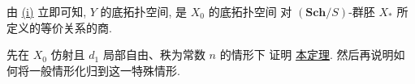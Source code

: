 由 \hyperref[thm:sga3-V-4.1-i]{(i)} 立即可知,
\(Y\) 的底拓扑空间, 是 \(X_0\) 的底拓扑空间
对 \((\mathbf{Sch}/S)\)-群胚 \(X_\ast\) 所定义的等价关系的商.

先在 \(X_0\) 仿射且 \(d_1\) 局部自由、秩为常数 \(n\) 的情形下
证明 \hyperref[thm:sga3-V-4.1]{本定理}.
然后再说明如何将一般情形化归到这一特殊情形.
